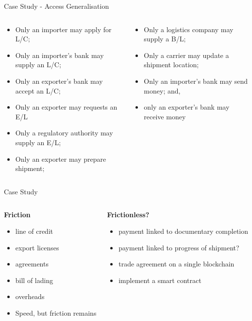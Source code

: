 \documentclass[pdf,table]{beamer}
\begin{document}
\begin{frame}{Case Study - Access Generalisation}
	\begin{columns}[T]
		\begin{column}{0.48\textwidth}
			\begin{itemize}
				\item Only an importer may apply for L/C; 
				\item Only an importer's bank may supply an L/C;
				\item Only an exporter's bank may accept an L/C;
				\item Only an exporter may requests an E/L
				\item Only a regulatory authority may supply an E/L;
				\item Only an exporter may prepare shipment;
		\end{itemize}
		\end{column}
		\begin{column}{0.48\textwidth}
			\begin{itemize}
				\item Only a logistics company may supply a B/L;
				\item Only a carrier may update a shipment location;
				\item Only an importer's bank may send money; and, 
				\item only an exporter's bank may receive money
			\end{itemize}
		\end{column}
	\end{columns}	
\end{frame}



\begin{frame}{Case Study}
	\begin{columns}[T]
		\begin{column}{0.48\textwidth}
			{\bf Friction}
			\begin{itemize}
				\item  line of credit
				\item export licenses
				\item agreements
				\item bill of lading
				\item overheads
				\item Speed, but friction remains
			\end{itemize}
		\end{column}
		\begin{column}{0.48\textwidth}
			{\bf Frictionless?}
			\begin{itemize}
				\item payment linked to documentary completion
				\item payment linked to progress of shipment?
				\item trade agreement on a single blockchain
				\item implement a smart contract
			\end{itemize}
		\end{column}
	\end{columns}	
\end{frame}
\end{document}
